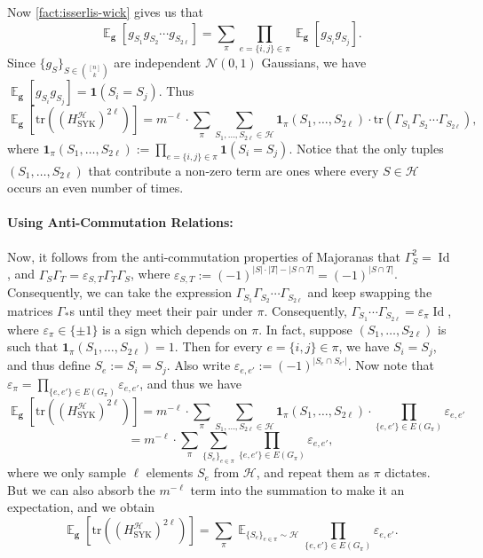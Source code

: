\documentclass
[11pt,letterpaper]
{article}
\theoremstyle{definition}
\newcommand{\cN}{\mathcal{N}}
\newcommand{\eps}{\varepsilon}
\newcommand{\1}{\mathbf{1}}
\newcommand{\tr}{\mathrm{tr}}
\newcommand{\cH}{\mathcal H}
\newcommand{\Id}{\operatorname{Id}}
\DeclareMathOperator*{\E}{\mathbb{E}}
\begin{document}
Now \cref{fact:isserlis-wick} gives us that 
\[\E_{\bm g}\left[g_{S_1}g_{S_2}\cdots g_{S_{2\ell}}\right] = \sum_\pi\prod_{e = \{i, j\}\in\pi}\E_{\bm g}[g_{S_i}g_{S_j}].\]
Since $\{g_S\}_{S\in\binom{[n]}{k}}$ are independent $\cN(0, 1)$ Gaussians, we have $\E_{\bm g}[g_{S_i}g_{S_j}] = \1(S_i = S_j)$. Thus 
\[\E_{\bm g}\left[\tr((H^\cH_{\operatorname{SYK}})^{2\ell})\right] = m^{-\ell}\cdot\sum_\pi\sum_{S_1, \ldots, S_{2\ell}\in\cH}\1_\pi(S_1, \ldots, S_{2\ell})\cdot\tr\left(\Gamma_{S_1}\Gamma_{S_2}\cdots\Gamma_{S_{2\ell}}\right),\]
where $\1_\pi(S_1, \ldots, S_{2\ell}):= \prod_{e = \{i, j\}\in\pi}\1(S_i = S_j)$. Notice that the only tuples $(S_1, \ldots, S_{2\ell})$ that contribute a non-zero term are ones where every $S\in\cH$ occurs an even number of times.

\paragraph{Using Anti-Commutation Relations:} Now, it follows from the anti-commutation properties of Majoranas that $\Gamma_S^2 = \Id$, and $\Gamma_S\Gamma_T = \eps_{S, T}\Gamma_T\Gamma_S$, where $\eps_{S, T}:= (-1)^{|S|\cdot|T| - |S\cap T|} = (-1)^{|S\cap T|}$. Consequently, we can take the expression $\Gamma_{S_1}\Gamma_{S_2}\cdots\Gamma_{S_{2\ell}}$ and keep swapping the matrices $\Gamma_\ast$s until they meet their pair under $\pi$. Consequently, $\Gamma_{S_1}\cdots\Gamma_{S_{2\ell}} = \eps_\pi\Id$, where $\eps_\pi\in\{\pm 1\}$ is a sign which depends on $\pi$. In fact, suppose $(S_1, \ldots, S_{2\ell})$ is such that $\1_\pi(S_1, \ldots, S_{2\ell}) = 1$. Then for every $e = \{i, j\}\in\pi$, we have $S_i = S_j$, and thus define $S_e:= S_i = S_j$. Also write $\eps_{e, e'}:= (-1)^{|S_e\cap S_{e'}|}$. Now note that $\eps_\pi = \prod_{\{e, e'\}\in E(G_\pi)}\eps_{e, e'}$, and thus we have 
\[\E_{\bm g}\left[\tr((H^\cH_{\operatorname{SYK}})^{2\ell})\right] = m^{-\ell}\cdot\sum_\pi\sum_{S_1, \ldots, S_{2\ell}\in\cH}\1_\pi(S_1, \ldots, S_{2\ell})\cdot\prod_{\{e, e'\}\in E(G_\pi)}\eps_{e, e'}\]
\[ = m^{-\ell}\cdot\sum_\pi\sum_{\{S_e\}_{e\in\pi}}\prod_{\{e, e'\}\in E(G_\pi)}\eps_{e, e'},\]
where we only sample $\ell$ elements $S_e$ from $\cH$, and repeat them as $\pi$ dictates. But we can also absorb the $m^{-\ell}$ term into the summation to make it an expectation, and we obtain
\begin{equation}
\label{eq:trace-moment-expansion}
\E_{\bm g}\left[\tr((H^\cH_{\operatorname{SYK}})^{2\ell})\right] = \sum_\pi\E_{\{S_e\}_{e\in\pi}\sim\cH}\prod_{\{e, e'\}\in E(G_\pi)}\eps_{e, e'}.
\end{equation}
\end{document}

